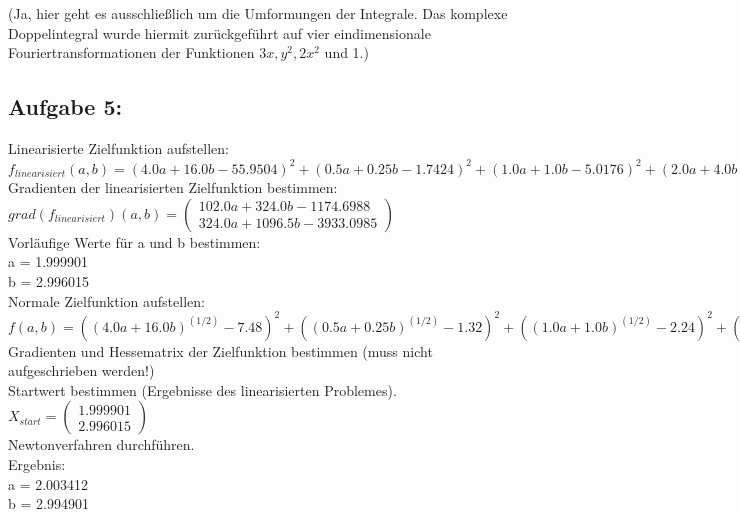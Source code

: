 \documentclass[11pt,final]{scrreprt}
\begin{document}
(Ja, hier geht es ausschließlich um die Umformungen der Integrale. Das komplexe Doppelintegral wurde hiermit zurückgeführt auf vier eindimensionale Fouriertransformationen der Funktionen $3x, y^2, 2x^2$ und 1.)\\

\subsection{Aufgabe 5:}

Linearisierte Zielfunktion aufstellen:\\
$f_{linearisiert}(a, b) =  (4.0a + 16.0b - 55.9504)^2 + (0.5a + 0.25b - 1.7424)^2 + (1.0a + 1.0b - 5.0176)^2 + (2.0a + 4.0b - 16.0)^2 + (2.5a + 6.25b - 23.7169)^2 + (1.5a + 2.25b - 9.7344)^2 + (3.0a + 9.0b - 32.9476)^2 + (3.5a + 12.25b - 43.6921)^2$\\

Gradienten der linearisierten Zielfunktion bestimmen:\\
$ grad(f_{linearisiert})(a, b) = \left(\begin{matrix}
102.0a+324.0b-1174.6988\\324.0a + 1096.5b - 3933.0985
\end{matrix}\right) $\\

Vorläufige Werte für a und b bestimmen:\\
a = 1.999901\\
b = 2.996015\\

Normale Zielfunktion aufstellen:\\
$f(a, b) =  ((4.0a + 16.0b)^(1/2) - 7.48)^2 + ((0.5a + 0.25b)^(1/2) - 1.32)^2 + ((1.0a + 1.0b)^(1/2) - 2.24)^2 + ((2.0a + 4.0b)^(1/2) - 4.0)^2 + ((1.5a + 2.25b)^(1/2) - 3.12)^2 + ((3.0a + 9.0b)^(1/2) - 5.74)^2 + ((2.5a + 6.25b)^(1/2) - 4.87)^2 + ((3.5a + 12.25b)^(1/2) - 6.61)^2$\\

Gradienten und Hessematrix der Zielfunktion bestimmen (muss nicht aufgeschrieben werden!)\\

Startwert bestimmen (Ergebnisse des linearisierten Problemes).\\
$ X_{start} = \left(\begin{matrix}
1.999901\\2.996015
\end{matrix}\right) $\\

Newtonverfahren durchführen.\\
Ergebnis:\\
a = 2.003412\\
b = 2.994901\\
\end{document}
